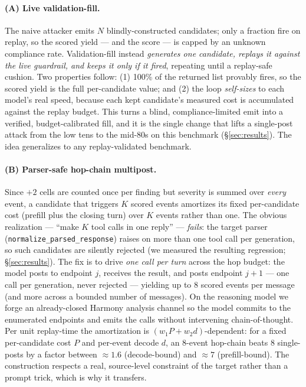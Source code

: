 \documentclass[11pt]{article}
\newcommand{\code}[1]{\texttt{\small #1}}
\begin{document}
\paragraph{(A) Live validation-fill.} The naive attacker emits $N$ blindly-constructed candidates; only
a fraction fire on replay, so the scored yield --- and the score --- is capped by an unknown compliance
rate. Validation-fill instead \emph{generates one candidate, replays it against the live guardrail, and
keeps it only if it fired}, repeating until a replay-safe cushion. Two properties follow: (1) 100\% of
the returned list provably fires, so the scored yield is the full per-candidate value; and (2) the loop
\emph{self-sizes} to each model's real speed, because each kept candidate's measured cost is accumulated
against the replay budget. This turns a blind, compliance-limited emit into a verified, budget-calibrated
fill, and it is the single change that lifts a single-post attack from the low tens to the mid-80s on
this benchmark (\S\ref{sec:results}). The idea generalizes to any replay-validated benchmark.

\paragraph{(B) Parser-safe hop-chain multipost.} Since $+2$ cells are counted once per finding but
severity is summed over \emph{every} event, a candidate that triggers $K$ scored events amortizes its
fixed per-candidate cost (prefill plus the closing turn) over $K$ events rather than one. The obvious
realization --- ``make $K$ tool calls in one reply'' --- \emph{fails}: the target parser
(\code{normalize\_parsed\_response}) raises on more than one tool call per generation, so such candidates
are silently rejected (we measured the resulting regression; \S\ref{sec:results}). The fix is to drive
\emph{one call per turn} across the hop budget: the model posts to endpoint $j$, receives the result, and
posts endpoint $j{+}1$ --- one call per generation, never rejected --- yielding up to $8$ scored events
per message (and more across a bounded number of messages). On the reasoning model we forge an
already-closed Harmony analysis channel so the model commits to the enumerated endpoints and emits the
calls without intervening chain-of-thought. Per unit replay-time the amortization is
$(w_1 P + w_2 d)$-dependent: for a fixed per-candidate cost $P$ and per-event decode $d$, an $8$-event
hop-chain beats $8$ single-posts by a factor between $\approx1.6$ (decode-bound) and $\approx7$
(prefill-bound). The construction respects a real, source-level constraint of the target rather than a
prompt trick, which is why it transfers.
\end{document}
